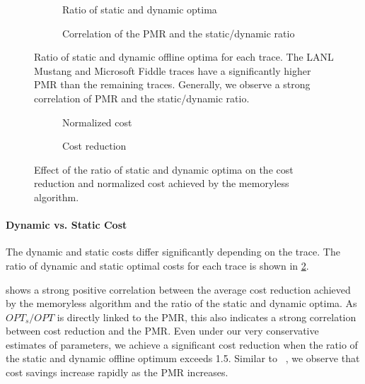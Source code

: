 \begin{figure}
    \begin{subfigure}[b]{.5\linewidth}
    \resizebox{\textwidth}{!}{}
    \caption{Ratio of static and dynamic optima}
    \end{subfigure}
    \begin{subfigure}[b]{.5\linewidth}
    \resizebox{\textwidth}{!}{}
    \caption{Correlation of the PMR and the static/dynamic ratio}\label{fig:case_studies:ud:opt_vs_opts:pmr}
    \end{subfigure}
    \caption{Ratio of static and dynamic offline optima for each trace. The LANL Mustang and Microsoft Fiddle traces have a significantly higher PMR than the remaining traces. Generally, we observe a strong correlation of PMR and the static/dynamic ratio.}\label{fig:case_studies:ud:opt_vs_opts}
\end{figure}

\begin{figure}
    \begin{subfigure}[b]{.49\linewidth}
    \resizebox{\textwidth}{!}{}
    \caption{Normalized cost}\label{fig:case_studies:ud:opt_vs_opts_against_normalized_cost}
    \end{subfigure}
    \begin{subfigure}[b]{.51\linewidth}
    \resizebox{\textwidth}{!}{}
    \caption{Cost reduction}\label{fig:case_studies:ud:opt_vs_opts_against_mean_cost_reduction}
    \end{subfigure}
    \caption{Effect of the ratio of static and dynamic optima on the cost reduction and normalized cost achieved by the memoryless algorithm.}
\end{figure}

\paragraph{Dynamic vs. Static Cost} The dynamic and static costs differ significantly depending on the trace. The ratio of dynamic and static optimal costs for each trace is shown in \cref{fig:case_studies:ud:opt_vs_opts}.

 shows a strong positive correlation between the average cost reduction achieved by the memoryless algorithm and the ratio of the static and dynamic optima. As $OPT_s / OPT$ is directly linked to the PMR, this also indicates a strong correlation between cost reduction and the PMR. Even under our very conservative estimates of parameters, we achieve a significant cost reduction when the ratio of the static and dynamic offline optimum exceeds 1.5. Similar to \citeauthor*{Lin2011}~\cite{Lin2011}, we observe that cost savings increase rapidly as the PMR increases.

